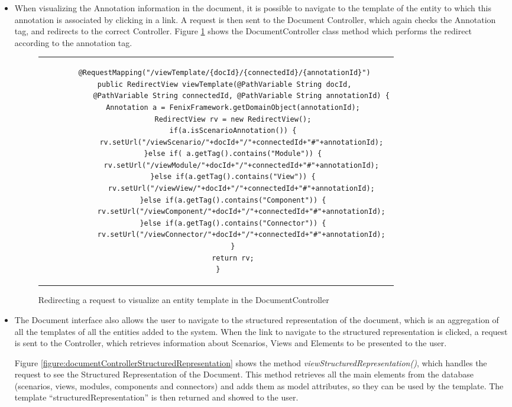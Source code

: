 \begin{itemize}
\item When visualizing the Annotation information in the document, it is possible to navigate to the template of the entity to which this annotation is associated by clicking in a link. A request is then sent to the Document Controller, which again checks the Annotation tag, and redirects to the correct Controller. Figure \ref{figure:documentControllerViewTemplate} shows the DocumentController class method which performs the redirect according to the annotation tag.

\begin{figure}[h]
\centering
\lstset{style=customjava}
\begin{tabular}{c}
\begin{lstlisting}
	@RequestMapping("/viewTemplate/{docId}/{connectedId}/{annotationId}")
	public RedirectView viewTemplate(@PathVariable String docId,
			@PathVariable String connectedId, @PathVariable String annotationId) {
		Annotation a = FenixFramework.getDomainObject(annotationId);
		RedirectView rv = new RedirectView();
		if(a.isScenarioAnnotation()) {
			rv.setUrl("/viewScenario/"+docId+"/"+connectedId+"#"+annotationId);
		}else if( a.getTag().contains("Module")) {
			rv.setUrl("/viewModule/"+docId+"/"+connectedId+"#"+annotationId);
		}else if(a.getTag().contains("View")) {
			rv.setUrl("/viewView/"+docId+"/"+connectedId+"#"+annotationId);
		}else if(a.getTag().contains("Component")) {
			rv.setUrl("/viewComponent/"+docId+"/"+connectedId+"#"+annotationId);
		}else if(a.getTag().contains("Connector")) {
			rv.setUrl("/viewConnector/"+docId+"/"+connectedId+"#"+annotationId);
		}
		return rv;
	}	
\end{lstlisting}
\end{tabular}
\caption{Redirecting a request to visualize an entity template in the DocumentController}
\label{figure:documentControllerViewTemplate}
\end{figure}

\item The Document interface also allows the user to navigate to the structured representation of the document, which is an aggregation of all the templates of all the entities added to the system. When the link to navigate to the structured representation is clicked, a request is sent to the Controller, which retrieves information about Scenarios, Views and Elements to be presented to the user. 

Figure \ref{figure:documentControllerStructuredRepresentation} shows the method \textit{viewStructuredRepresentation()}, which handles the request to see the Structured Representation of the Document. This method retrieves all the main elements from the database (scenarios, views, modules, components and connectors) and adds them as model attributes, so they can be used by the template. The template ``structuredRepresentation'' is then returned and showed to the user.


\end{itemize}
